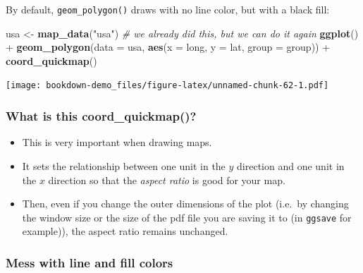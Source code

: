 \documentclass[]{book}
\newenvironment{Shaded}{\begin{snugshade}}{\end{snugshade}}
\newcommand{\KeywordTok}[1]{\textcolor[rgb]{0.13,0.29,0.53}{\textbf{{#1}}}}
\newcommand{\DataTypeTok}[1]{\textcolor[rgb]{0.13,0.29,0.53}{{#1}}}
\newcommand{\StringTok}[1]{\textcolor[rgb]{0.31,0.60,0.02}{{#1}}}
\newcommand{\CommentTok}[1]{\textcolor[rgb]{0.56,0.35,0.01}{\textit{{#1}}}}
\newcommand{\NormalTok}[1]{{#1}}
\providecommand{\tightlist}{%
  \setlength{\itemsep}{0pt}\setlength{\parskip}{0pt}}
\theoremstyle{definition}
\theoremstyle{definition}
\theoremstyle{remark}
\begin{document}
By default, \texttt{geom\_polygon()} draws with no line color, but with
a black fill:

\begin{Shaded}
\begin{Highlighting}[]
\NormalTok{usa <-}\StringTok{ }\KeywordTok{map_data}\NormalTok{(}\StringTok{"usa"}\NormalTok{) }\CommentTok{# we already did this, but we can do it again}
\KeywordTok{ggplot}\NormalTok{() +}\StringTok{ }
\StringTok{  }\KeywordTok{geom_polygon}\NormalTok{(}\DataTypeTok{data =} \NormalTok{usa, }\KeywordTok{aes}\NormalTok{(}\DataTypeTok{x =} \NormalTok{long, }\DataTypeTok{y =} \NormalTok{lat, }\DataTypeTok{group =} \NormalTok{group)) +}\StringTok{ }
\StringTok{  }\KeywordTok{coord_quickmap}\NormalTok{()}
\end{Highlighting}
\end{Shaded}

\texttt{[image: bookdown-demo\_files/figure-latex/unnamed-chunk-62-1.pdf]}

\subsubsection{What is this
coord\_quickmap()?}\label{what-is-this-coord_quickmap}

\begin{itemize}
\tightlist
\item
  This is very important when drawing maps.
\item
  It sets the relationship between one unit in the \(y\) direction and
  one unit in the \(x\) direction so that the \emph{aspect ratio} is
  good for your map.
\item
  Then, even if you change the outer dimensions of the plot (i.e.~by
  changing the window size or the size of the pdf file you are saving it
  to (in \texttt{ggsave} for example)), the aspect ratio remains
  unchanged.
\end{itemize}

\subsubsection{Mess with line and fill
colors}\label{mess-with-line-and-fill-colors}
\end{document}
